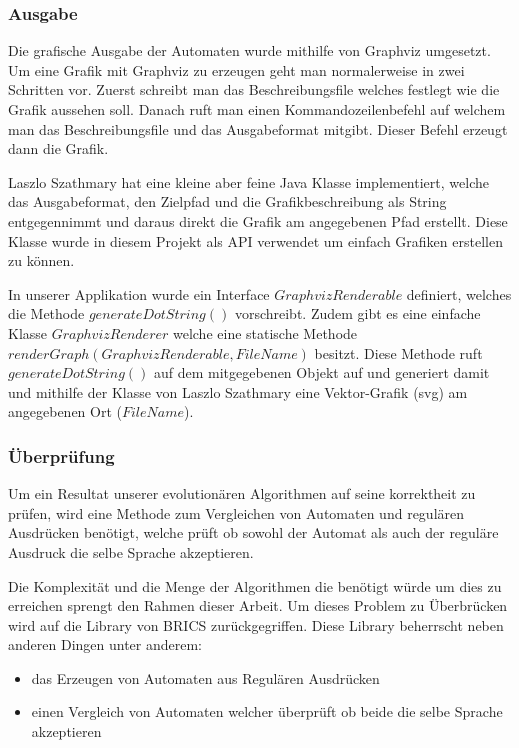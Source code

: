 \subsubsection{Ausgabe}
Die grafische Ausgabe der Automaten wurde mithilfe von Graphviz \cite{graphviz} umgesetzt. Um eine Grafik mit Graphviz zu erzeugen geht man normalerweise in zwei Schritten vor. Zuerst schreibt man das Beschreibungsfile welches festlegt wie die Grafik aussehen soll. Danach ruft man einen Kommandozeilenbefehl auf welchem man das Beschreibungsfile und das Ausgabeformat mitgibt. Dieser Befehl erzeugt dann die Grafik.

Laszlo Szathmary hat eine kleine aber feine Java Klasse implementiert, welche das Ausgabeformat, den Zielpfad und die Grafikbeschreibung als String entgegennimmt und daraus direkt die Grafik am angegebenen Pfad erstellt. Diese Klasse wurde in diesem Projekt als API verwendet um einfach Grafiken erstellen zu können.

In unserer Applikation wurde ein Interface $GraphvizRenderable$ definiert, welches die Methode $generateDotString()$ vorschreibt. Zudem gibt es eine einfache Klasse $GraphvizRenderer$ welche eine statische Methode $renderGraph(GraphvizRenderable, FileName)$ besitzt. Diese Methode ruft $generateDotString()$ auf dem mitgegebenen Objekt auf und generiert damit und mithilfe der Klasse von Laszlo Szathmary eine Vektor-Grafik (svg) am angegebenen Ort ($FileName$).

\subsubsection{Überprüfung}
Um ein Resultat unserer evolutionären Algorithmen auf seine korrektheit zu prüfen, wird eine Methode zum Vergleichen von Automaten und regulären Ausdrücken benötigt, welche prüft ob sowohl der Automat als auch der reguläre Ausdruck die selbe Sprache akzeptieren.

Die Komplexität und die Menge der Algorithmen die benötigt würde um dies zu erreichen sprengt den Rahmen dieser Arbeit. Um dieses Problem zu Überbrücken wird auf die Library von BRICS zurückgegriffen. Diese Library beherrscht neben anderen Dingen unter anderem:
\begin{itemize}
  \item das Erzeugen von Automaten aus Regulären Ausdrücken
  \item einen Vergleich von Automaten welcher überprüft ob beide die selbe Sprache akzeptieren 
\end{itemize}

